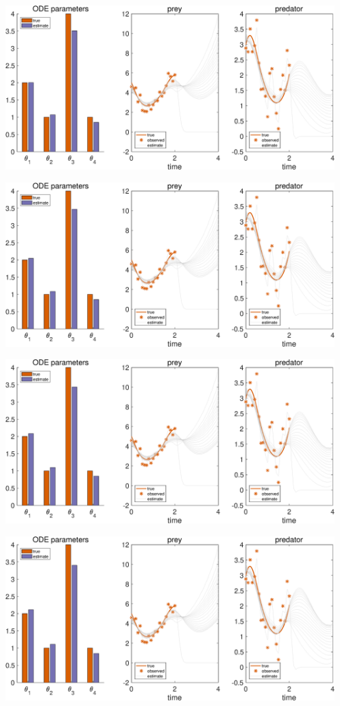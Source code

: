 {\includegraphics [width=5in]{Lotka_Volterra_3_21.eps}

\includegraphics [width=5in]{Lotka_Volterra_3_22.eps}

\includegraphics [width=5in]{Lotka_Volterra_3_23.eps}

\includegraphics [width=5in]{Lotka_Volterra_3_24.eps}

}
